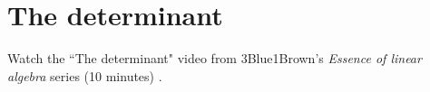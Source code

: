 \section{The determinant}

Watch the ``The determinant" video from 3Blue1Brown's
\textit{Essence of linear algebra} series (10 minutes)
\cite{bib:linalg_the_determinant}.
